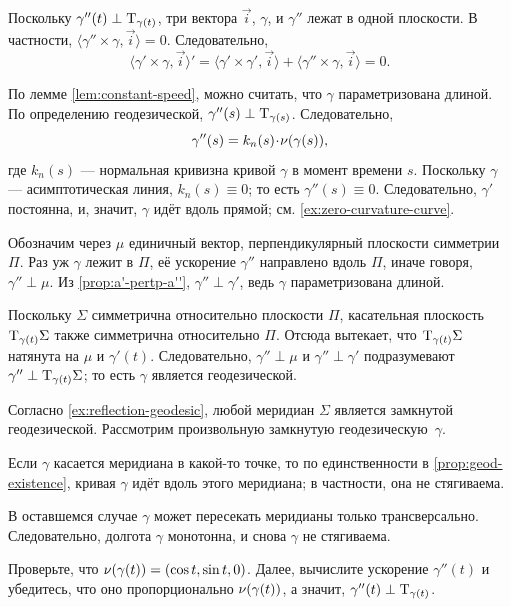 \begin{multicols}{2}
Поскольку $\gamma''(t)\perp\mathrm{T}_{\gamma(t)}$, три вектора $\vec i$, $\gamma$, и $\gamma''$ лежат в одной плоскости.
В частности, $\langle\gamma''\times \gamma,\vec i\rangle=0$.
Следовательно,
\[
\langle\gamma'\times \gamma,\vec i\rangle'
=
\langle\gamma'\times \gamma',\vec i\rangle+\langle\gamma''\times \gamma,\vec i\rangle =0
.\]

По лемме \ref{lem:constant-speed}, можно считать, что $\gamma$ параметризована длиной.
По определению геодезической, $\gamma''(s)\perp\mathrm{T}_{\gamma(s)}$. 
Следовательно, 
\[\gamma''(s)=k_n(s)\cdot\Norm(\gamma(s)),\]
где $k_n(s)$ --- нормальная кривизна кривой $\gamma$ в момент времени $s$.
Поскольку $\gamma$ --- асимптотическая линия, $k_n(s)\equiv 0$;
то есть $\gamma''(s)\equiv 0$.
Следовательно, $\gamma'$ постоянна, и, значит, $\gamma$ идёт вдоль прямой; см. \ref{ex:zero-curvature-curve}.

Обозначим через $\mu$ единичный вектор, перпендикулярный плоскости симметрии $\Pi$.
Раз уж $\gamma$ лежит в $\Pi$, её ускорение $\gamma''$ направлено вдоль $\Pi$, иначе говоря, $\gamma''\perp \mu$.
Из \ref{prop:a'-pertp-a''}, $\gamma''\perp\gamma'$, ведь $\gamma$ параметризована длиной.

Поскольку $\Sigma$ симметрична относительно плоскости $\Pi$,
касательная плоскость $\mathrm{T}_{\gamma(t)}\Sigma$ также симметрична относительно $\Pi$.
Отсюда вытекает, что $\mathrm{T}_{\gamma(t)}\Sigma$ натянута на $\mu$ и $\gamma'(t)$.
Следовательно, $\gamma''\perp \mu$ и $\gamma''\perp\gamma'$ подразумевают $\gamma''\perp\mathrm{T}_{\gamma(t)}\Sigma$;
то есть $\gamma$ является геодезической.

Согласно \ref{ex:reflection-geodesic}, любой меридиан $\Sigma$ является замкнутой геодезической.
Рассмотрим произвольную замкнутую геодезическую~$\gamma$.

Если $\gamma$ касается меридиана в какой-то точке, то по единственности в \ref{prop:geod-existence}, кривая $\gamma$ идёт вдоль этого меридиана;
в частности, она не стягиваема.

В оставшемся случае $\gamma$ может пересекать меридианы только трансверсально.
Следовательно, долгота $\gamma$ монотонна, и снова $\gamma$ не стягиваема.

Проверьте, что $\Norm(\gamma(t))\z=(\cos t,\sin t, 0)$.
Далее, вычислите ускорение $\gamma''(t)$ и убедитесь, что оно пропорционально $\nu(\gamma(t))$,
а значит, $\gamma''(t)\z\perp\T_{\gamma(t)}$. 


\end{multicols}
